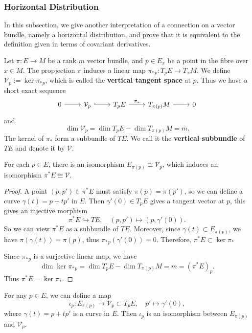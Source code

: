 \subsubsection{Horizontal Distribution}
In this subsection, we give another interpretation of a connection on a vector bundle, namely a horizontal distribution, 
and prove that it is equivalent to the definition given in terms of covariant derivatives.

Let $\pi:E\to M$ be a rank $m$ vector bundle, and $p\in E_x$ be a point in the fibre over $x\in M$. 
The propjection $\pi$ induces a linear map $\pi_*{}_p: T_p E \to T_x M$. 
We define $\mathcal{V}_p:=\ker \pi_*{}_p$, which is called the \textbf{vertical tangent space} at $p$. 
Thus we have a short exact sequence 
\[\begin{tikzcd}
    0 & {\mathcal{V}_p} & T_pE & {T_{\pi(p)}M} & 0
    \arrow[from=1-1, to=1-2]
    \arrow[ hook, from=1-2, to=1-3]
    \arrow["\pi_*", from=1-3, to=1-4]
    \arrow[from=1-4, to=1-5]
\end{tikzcd}\]
and
\begin{equation*}
    \dim \mathcal{V}_p = \dim T_p E - \dim T_{\pi(p)} M = m.
\end{equation*}
The kernel of $\pi_*$ form a subbundle of $TE$. 
We call it the \textbf{vertical subbundle} of $TE$ and denote it by $\mathcal{V}$.
\begin{proposition}
    For each $p\in E$, there is an isomorphism $E_{\pi(p)} \cong \mathcal{V}_p$, which induces an 
    isomorphism $\pi^* E \cong \mathcal{V}$. 
\end{proposition}
\begin{proof}
    A point $(p,p')\in \pi^* E$ must satisfy $\pi(p) = \pi(p')$, so we can define a curve $\gamma(t) = p + t p'$ in $E$.
    Then $\gamma'(0) \in T_p E$ gives a tangent vector at $p$, this gives an injective morphism 
    \begin{equation*}
        \pi^* E \hookrightarrow TE, \quad (p,p') \mapsto (p,\gamma'(0)).
    \end{equation*}
    So we can view $\pi^* E$ as a subbundle of $TE$. 
    Moreover, since $\gamma(t)\subset E_{\pi(p)}$, we have $\pi(\gamma(t)) = \pi(p)$, thus $\pi_*{}_p(\gamma'(0)) = 0$. 
    Therefore, $\pi^* E\subset \ker\pi_*$ 

    Since $\pi_*{}_p$ is a surjective linear map, we have 
    \begin{equation*}
        \dim \ker \pi_*{}_p = \dim T_p E - \dim T_{\pi(p)} M = m = (\pi^* E)_p.
    \end{equation*}
    Thus $\pi^* E = \ker \pi_*$.
\end{proof}
For any $p\in E$, we can define a map 
\begin{equation*}
    \iota_p: E_{\pi(p)} \to \mathcal{V}_p\subset T_p E, \quad p' \mapsto \gamma'(0),
\end{equation*}
where $\gamma(t) = p + t p'$ is a curve in $E$. 
Then $\iota_p$ is an isomorphism between $E_{\pi(p)}$ and $\mathcal{V}_p$.

